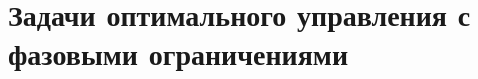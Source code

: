 \section{
    Задачи оптимального управления с фазовыми ограничениями
}\label{sec:ch3:sec2}
%
%
%
%
%
